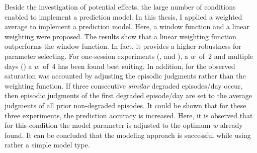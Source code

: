 Beside the investigation of potential effects, the large number of conditions enabled to implement a prediction model.
In this thesis, I applied a weighted average to implement a prediction model.
Here, a window function and a linear weighting were proposed.
The results show that a linear weighting function outperforms the window function.
In fact, it provides a higher robustness for parameter selecting.
For one-session experiments (, and \EIIa{}), a $\mathit{w}$~of~2 and multiple days () a $\mathit{w}$~of~4 has been found best suiting.
In addition, for the observed saturation was accounted by adjusting the episodic judgments rather than the weighting function.
If three consecutive \emph{similar} degraded episodes/day occur, then episodic judgments of the first degraded episode/day are set to the average judgments of all prior non-degraded episodes.
It could be shown that for these three experiments, the prediction accuracy is increased.
Here, it is observed that for this condition the model parameter is adjusted to the optimum $\mathit{w}$ already found.
It can be concluded that the modeling approach is successful while using rather a simple model type.


